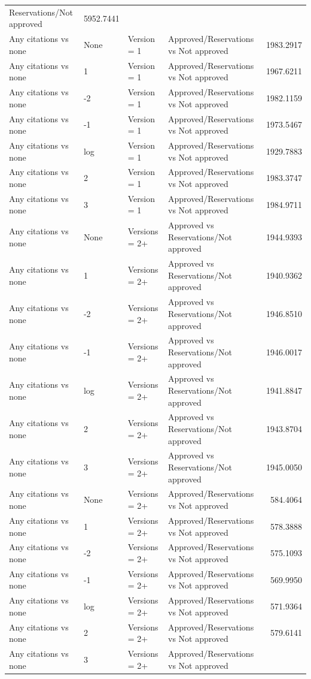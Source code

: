 \begin{table}[ht]
\begin{tabular}{llllr}
Reservations/Not approved & 5952.7441 \\ 
  Any citations vs none & None & Version = 1 & Approved/Reservations
vs Not approved & 1983.2917 \\ 
  Any citations vs none & 1 & Version = 1 & Approved/Reservations
vs Not approved & 1967.6211 \\ 
  Any citations vs none & -2 & Version = 1 & Approved/Reservations
vs Not approved & 1982.1159 \\ 
  Any citations vs none & -1 & Version = 1 & Approved/Reservations
vs Not approved & 1973.5467 \\ 
  Any citations vs none & log & Version = 1 & Approved/Reservations
vs Not approved & 1929.7883 \\ 
  Any citations vs none & 2 & Version = 1 & Approved/Reservations
vs Not approved & 1983.3747 \\ 
  Any citations vs none & 3 & Version = 1 & Approved/Reservations
vs Not approved & 1984.9711 \\ 
  Any citations vs none & None & Versions = 2+ & Approved vs
Reservations/Not approved & 1944.9393 \\ 
  Any citations vs none & 1 & Versions = 2+ & Approved vs
Reservations/Not approved & 1940.9362 \\ 
  Any citations vs none & -2 & Versions = 2+ & Approved vs
Reservations/Not approved & 1946.8510 \\ 
  Any citations vs none & -1 & Versions = 2+ & Approved vs
Reservations/Not approved & 1946.0017 \\ 
  Any citations vs none & log & Versions = 2+ & Approved vs
Reservations/Not approved & 1941.8847 \\ 
  Any citations vs none & 2 & Versions = 2+ & Approved vs
Reservations/Not approved & 1943.8704 \\ 
  Any citations vs none & 3 & Versions = 2+ & Approved vs
Reservations/Not approved & 1945.0050 \\ 
  Any citations vs none & None & Versions = 2+ & Approved/Reservations
vs Not approved & 584.4064 \\ 
  Any citations vs none & 1 & Versions = 2+ & Approved/Reservations
vs Not approved & 578.3888 \\ 
  Any citations vs none & -2 & Versions = 2+ & Approved/Reservations
vs Not approved & 575.1093 \\ 
  Any citations vs none & -1 & Versions = 2+ & Approved/Reservations
vs Not approved & 569.9950 \\ 
  Any citations vs none & log & Versions = 2+ & Approved/Reservations
vs Not approved & 571.9364 \\ 
  Any citations vs none & 2 & Versions = 2+ & Approved/Reservations
vs Not approved & 579.6141 \\ 
  Any citations vs none & 3 & Versions = 2+ & Approved/Reservations
vs Not approved &  \\ 
  \end{tabular}
\end{table}
